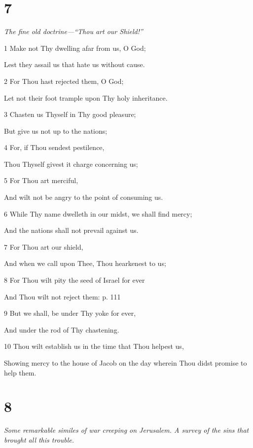 \chapter{7}

\par \textit{The fine old doctrine—“Thou art our Shield!”}

\par 1 Make not Thy dwelling afar from us, O God;
\par  Lest they assail us that hate us without cause.
\par 2 For Thou hast rejected them, O God;
\par  Let not their foot trample upon Thy holy inheritance.
\par 3 Chasten us Thyself in Thy good pleasure;
\par  But give us not up to the nations;
\par 4 For, if Thou sendest pestilence,
\par  Thou Thyself givest it charge concerning us;
\par 5 For Thou art merciful,
\par  And wilt not be angry to the point of consuming us.
\par    
\par 6 While Thy name dwelleth in our midst, we shall find mercy;
\par  And the nations shall not prevail against us.
\par 7 For Thou art our shield,
\par  And when we call upon Thee, Thou hearkenest to us;
\par 8 For Thou wilt pity the seed of Israel for ever
\par  And Thou wilt not reject them: p. 111
\par 9 But we shall, be under Thy yoke for ever,
\par  And under the rod of Thy chastening.
\par 10 Thou wilt establish us in the time that Thou helpest us,
\par  Showing mercy to the house of Jacob on the day wherein Thou didst promise to help them.

\chapter{8}

\par \textit{Some remarkable similes of war creeping on Jerusalem. A survey of the sins that brought all this trouble.}

